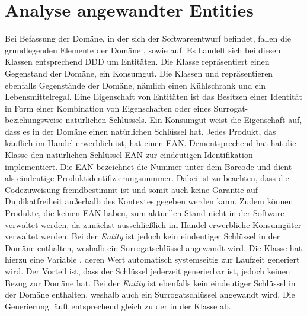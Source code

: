 \section{Analyse angewandter Entities}
\label{domaindrivendesign>entities}
Bei Befassung der Domäne, in der sich der Softwareentwurf befindet, fallen die grundlegenden Elemente der Domäne \href{}{}, \href{}{} sowie \href{}{} auf.
Es handelt sich bei diesen Klassen entsprechend \ac{DDD} um Entitäten.
Die Klasse \href{}{\code{}} repräsentiert einen Gegenstand der Domäne, ein Konsumgut.
Die Klassen \href{}{\code{}} und \href{}{\code{}} repräsentieren ebenfalls Gegenstände der Domäne, nämlich einen Kühlschrank und ein Lebensmittelregal.
Eine Eigenschaft von Entitäten ist das Besitzen einer Identität in Form einer Kombination von Eigenschaften oder eines Surrogat- beziehungsweise natürlichen Schlüssels.
Ein Konsumgut weist die Eigenschaft auf, dass es in der Domäne einen natürlichen Schlüssel hat.
Jedes Produkt, das käuflich im Handel erwerblich ist, hat einen \ac{EAN}.
Dementsprechend hat hat die Klasse \href{}{\code{}} den natürlichen Schlüssel \href{}{\code{}}\ac{EAN} zur eindeutigen Identifikation implementiert.
Die \ac{EAN} bezeichnet die Nummer unter dem Barcode und dient als eindeutige Produktidentifizierungsnummer.
Dabei ist zu beachten, dass die Codezuweisung fremdbestimmt ist und somit auch keine Garantie auf Duplikatfreiheit außerhalb des Kontextes gegeben werden kann.
Zudem können Produkte, die keinen \ac{EAN} haben, zum aktuellen Stand nicht in der Software verwaltet werden, da zunächst ausschließlich im Handel erwerbliche Konsumgüter verwaltet werden.
Bei der \textit{Entity} \href{}{\code{}} ist jedoch kein eindeutiger Schlüssel in der Domäne enthalten, weshalb ein Surrogatschlüssel angewandt wird.
Die Klasse \href{}{\code{}} hat hierzu eine Variable \href{}{}, deren Wert automatisch systemseitig zur Laufzeit generiert wird.
Der Vorteil ist, dass der Schlüssel jederzeit generierbar ist, jedoch keinen Bezug zur Domäne hat.
Bei der \textit{Entity} \href{}{\code{}} ist ebenfalls kein eindeutiger Schlüssel in der Domäne enthalten, weshalb auch ein Surrogatschlüssel angewandt wird.
Die Generierung läuft entsprechend gleich zu der in der Klasse \href{}{\code{}} ab.


